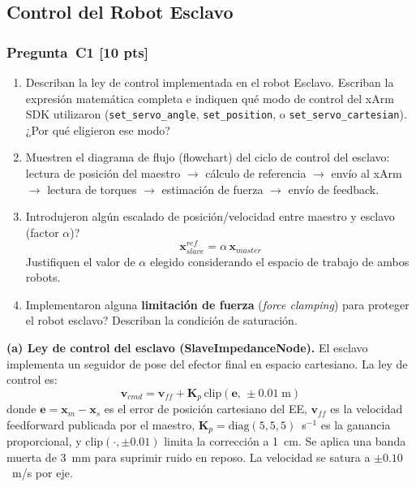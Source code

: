 \documentclass[journal,10pt,twoside]{IEEEtran}
\newcommand{\pts}[1]{\textcolor{tec_red}{\textbf{[#1 pts]}}}
\begin{document}
\subsection{Control del Robot Esclavo}

\subsubsection*{Pregunta~C1 \pts{10}}
\begin{enumerate}[label=(\alph*)]
  \item Describan la ley de control implementada en el robot Esclavo.
        Escriban la expresión matemática completa e indiquen qué modo
        de control del xArm SDK utilizaron
        (\texttt{set\_servo\_angle}, \texttt{set\_position},
        o \texttt{set\_servo\_cartesian}).
        ¿Por qué eligieron ese modo?
  \item Muestren el diagrama de flujo (flowchart) del ciclo de control
        del esclavo: lectura de posición del maestro $\rightarrow$
        cálculo de referencia $\rightarrow$ envío al xArm $\rightarrow$
        lectura de torques $\rightarrow$ estimación de fuerza
        $\rightarrow$ envío de feedback.
  \item Introdujeron algún escalado de posición/velocidad entre
        maestro y esclavo (factor $\alpha$)?
        \[
          \bm{x}_{slave}^{ref} = \alpha\,\bm{x}_{master}
        \]
        Justifiquen el valor de $\alpha$ elegido considerando
        el espacio de trabajo de ambos robots.
  \item Implementaron alguna \textbf{limitación de fuerza}
        (\textit{force clamping}) para proteger el robot esclavo?
        Describan la condición de saturación.
\end{enumerate}

\textbf{(a) Ley de control del esclavo (SlaveImpedanceNode).}
El esclavo implementa un seguidor de pose del efector final en espacio
cartesiano. La ley de control es:
\begin{equation}
  \bm{v}_{cmd} = \bm{v}_{ff} + \bm{K}_p \, \text{clip}(\bm{e},\, \pm 0.01\;\text{m})
  \label{eq:slave_law}
\end{equation}
donde $\bm{e} = \bm{x}_m - \bm{x}_s$ es el error de posición cartesiano
del EE, $\bm{v}_{ff}$ es la velocidad feedforward publicada por el
maestro, $\bm{K}_p = \text{diag}(5,5,5)$~s$^{-1}$ es la ganancia
proporcional, y clip$(\cdot, \pm0.01)$ limita la corrección a 1~cm.
Se aplica una banda muerta de 3~mm para suprimir ruido en reposo.
La velocidad se satura a $\pm 0.10$~m/s por eje.
\end{document}
